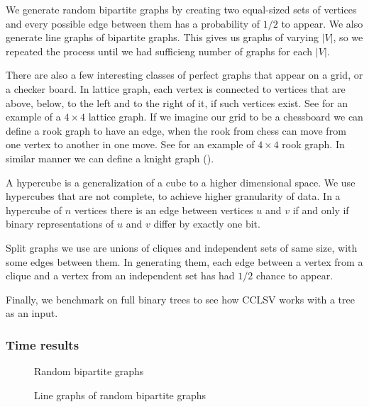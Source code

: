 We generate random bipartite graphs by creating two equal-sized sets of vertices and every possible edge between them has a probability of $1/2$ to appear. We also generate line graphs of bipartite graphs. This gives us graphs of varying $|V|$, so we repeated the process until we had sufficieng number of graphs for each $|V|$.

There are also a few interesting classes of perfect graphs that appear on a grid, or a checker board. In lattice graph, each vertex is connected to vertices that are above, below, to the left and to the right of it, if such vertices exist. See  for an example of a $4 \times 4$ lattice graph. If we imagine our grid to be a chessboard we can define a rook graph to have an edge, when the rook from chess can move from one vertex to another in one move. See  for an example of $4 \times 4$ rook graph. In similar manner we can define a knight graph ().

A hypercube is a generalization of a cube to a higher dimensional space. We use hypercubes that are not complete, to achieve higher granularity of data. In a hypercube of $n$ vertices there is an edge between vertices $u$ and $v$ if and only if binary representations of $u$ and $v$ differ by exactly one bit.

Split graphs we use are unions of cliques and independent sets of same size, with some edges between them. In generating them, each edge between a vertex from a clique and a vertex from an independent set has had $1/2$ chance to appear.

Finally, we benchmark on full binary trees to see how CCLSV works with a tree as an input.

\subsubsection{Time results}

%   

\begin{figure}
  \centering
  
  \caption{Random bipartite graphs}
  \label{plot:perf2Lines}
\end{figure}

\begin{figure}
  \centering
  
  \caption{Line graphs of random bipartite graphs}
  \label{plot:perf2Lines}
\end{figure}


